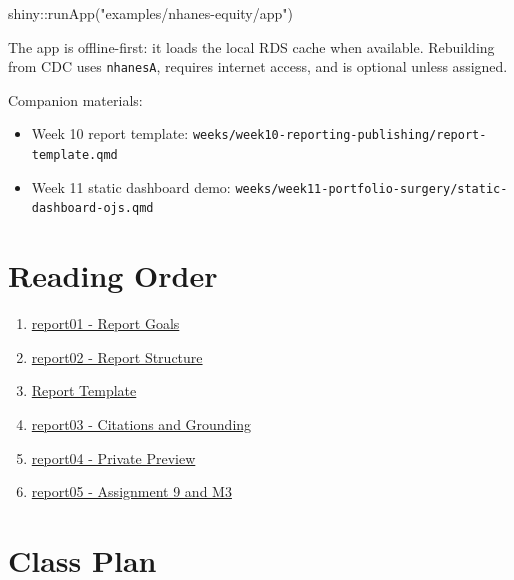 \documentclass[
  letterpaper,
  DIV=11,
  numbers=noendperiod,
  oneside]{scrreprt}
\newenvironment{Shaded}{\begin{snugshade}}{\end{snugshade}}
\newcommand{\FunctionTok}[1]{\textcolor[rgb]{0.28,0.35,0.67}{#1}}
\newcommand{\NormalTok}[1]{\textcolor[rgb]{0.00,0.23,0.31}{#1}}
\newcommand{\SpecialCharTok}[1]{\textcolor[rgb]{0.37,0.37,0.37}{#1}}
\newcommand{\StringTok}[1]{\textcolor[rgb]{0.13,0.47,0.30}{#1}}
\providecommand{\tightlist}{%
  \setlength{\itemsep}{0pt}\setlength{\parskip}{0pt}}
\begin{document}
\begin{Shaded}
\begin{Highlighting}[numbers=left,,]
\NormalTok{shiny}\SpecialCharTok{::}\FunctionTok{runApp}\NormalTok{(}\StringTok{"examples/nhanes{-}equity/app"}\NormalTok{)}
\end{Highlighting}
\end{Shaded}

The app is offline-first: it loads the local RDS cache when available.
Rebuilding from CDC uses \texttt{nhanesA}, requires internet access, and
is optional unless assigned.

Companion materials:

\begin{itemize}
\tightlist
\item
  Week 10 report template:
  \texttt{weeks/week10-reporting-publishing/report-template.qmd}
\item
  Week 11 static dashboard demo:
  \texttt{weeks/week11-portfolio-surgery/static-dashboard-ojs.qmd}
\end{itemize}

\section*{Reading Order}\label{reading-order-4}


\begin{enumerate}
\def\labelenumi{\arabic{enumi}.}
\tightlist
\item
  \href{report01-overview-and-goals.qmd}{report01 - Report Goals}
\item
  \href{report02-report-structure.qmd}{report02 - Report Structure}
\item
  \href{report-template.qmd}{Report Template}
\item
  \href{report03-citations-and-grounding.qmd}{report03 - Citations and
  Grounding}
\item
  \href{report04-private-preview.qmd}{report04 - Private Preview}
\item
  \href{report05-assignment-a9-and-m3.qmd}{report05 - Assignment 9 and
  M3}
\end{enumerate}

\section*{Class Plan}\label{class-plan-4}
\end{document}
